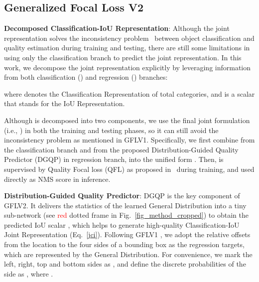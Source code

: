 \documentclass[10pt,twocolumn,letterpaper]{article}
\begin{document}
\fi

\begin{figure*}[t]
	\begin{center}
		\setlength{\fboxrule}{0pt}
	\end{center}	
	\vspace{-20pt}
	\caption{The illustration of the proposed Generalized Focal Loss V2 (GFLV2), where a novel and tiny Distribution-Guided Quality Predictor (DGQP) uses the statistics of learned bounding box distributions to facilitate generating reliable IoU quality estimations.}
	\label{fig_method_cropped}
	\vspace{-10pt}
\end{figure*}
\subsection{Generalized Focal Loss V2}
\label{sec_gflv2}
\noindent 
\textbf{Decomposed Classification-IoU Representation}:
Although the joint representation solves 
the inconsistency problem~\cite{li2020generalized} between 
{object classification}
and 
{quality estimation during training and testing,}
there are still some limitations in using 
{only}
{the classification branch to predict the joint representation.}
In this work, we decompose the joint representation explicitly by leveraging information from both classification () and regression () branches:

where 
denotes the Classification Representation of total  categories, and  is a scalar that stands for the IoU Representation.


Although  is decomposed into two components, 
we use the final joint formulation (i.e., ) in both the training and testing phases,
so it can still avoid the inconsistency problem as mentioned in GFLV1.
Specifically, 
we first combine  from the classification branch and  from the proposed Distribution-Guided Quality Predictor (DGQP) in  regression branch, into the unified form . Then,  is supervised by Quality Focal loss (QFL) as proposed in~\cite{li2020generalized} during training, and used directly as NMS score in inference.


\noindent \textbf{Distribution-Guided Quality Predictor}: 
DGQP is the key component of GFLV2.
It delivers the statistics of the learned General Distribution  into a tiny sub-network (see \textcolor{red}{red} dotted frame in Fig.~\ref{fig_method_cropped}) to obtain the predicted IoU scalar , which helps to generate high-quality Classification-IoU Joint Representation (Eq.~\eqref{jci}). 
Following GFLV1 \cite{li2020generalized},
we adopt the relative offsets from the location to the four sides of a bounding box as the regression targets, which are represented by the General Distribution. 
For convenience, we mark the left, right, top and bottom sides as , 
and define the discrete 
probabilities
of the  side as , where .
\end{document}
